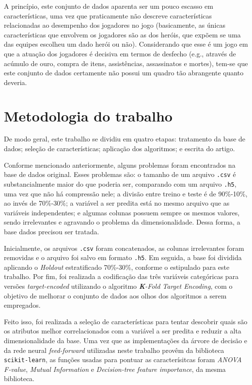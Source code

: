 \documentclass[12pt]{article}
\begin{document}
A princípio, este conjunto de dados aparenta ser um pouco escasso em características, uma vez que praticamente não descreve características relacionadas ao desempenho dos jogadores no jogo (basicamente, as únicas características que envolvem os jogadores são as dos heróis, que expõem se uma das equipes escolheu um dado herói ou não). Considerando que esse é um jogo em que a atuação dos jogadores é decisiva em termos de desfecho (e.g., através de acúmulo de ouro, compra de itens, assistências, assassinatos e mortes), tem-se que este conjunto de dados certamente não possui um quadro tão abrangente quanto deveria.

\section{Metodologia do trabalho}\label{sec:metodologia}
De modo geral, este trabalho se dividiu em quatro etapas: tratamento da base de dados; seleção de características; aplicação dos algoritmos; e escrita do artigo.

Conforme mencionado anteriormente, alguns problemas foram encontrados na base de dados original. Esses problemas são: o tamanho de um arquivo \texttt{.csv} é substancialmente maior do que poderia ser, comparando com um arquivo \texttt{.h5}, uma vez que não há compressão nele; a divisão entre treino e teste é de 90\%-10\%, ao invés de 70\%-30\%; a variável a ser predita está no mesmo arquivo que as variáveis independentes; e algumas colunas possuem sempre os mesmos valores, sendo irrelevantes e agravando o problema da dimensionalidade. Dessa forma, a base dados precisou ser tratada.

Inicialmente, os arquivos \texttt{.csv} foram concatenados, as colunas irrelevantes foram removidas e o arquivo foi salvo em formato \texttt{.h5}. Em seguida, a base foi dividida aplicando o \textit{Holdout} estratificado 70\%-30\%, conforme o estipulado para este trabalho. Por fim, foi realizada a codificação das três variáveis categóricas para versões \textit{target-encoded} utilizando o algoritmo \textit{\textbf{K}-Fold Target Encoding}, com o objetivo de melhorar o conjunto de dados aos olhos dos algoritmos a serem empregados.

Feito isso, foi realizada a seleção de características para tentar descobrir quais são os atributos melhor correlacionados com a variável a ser predita e reduzir a alta dimensionalidade da base. Uma vez que as implementações da árvore de decisão e da rede neural \textit{feed-forward} utilizadas neste trabalho provêm da biblioteca \texttt{scikit-learn}, as funções usadas para pontuar as caracterísitcas foram \textit{ANOVA F-value}, \textit{Mutual Information} e \textit{Decision-tree feature importance}, da mesma biblioteca.
\end{document}
